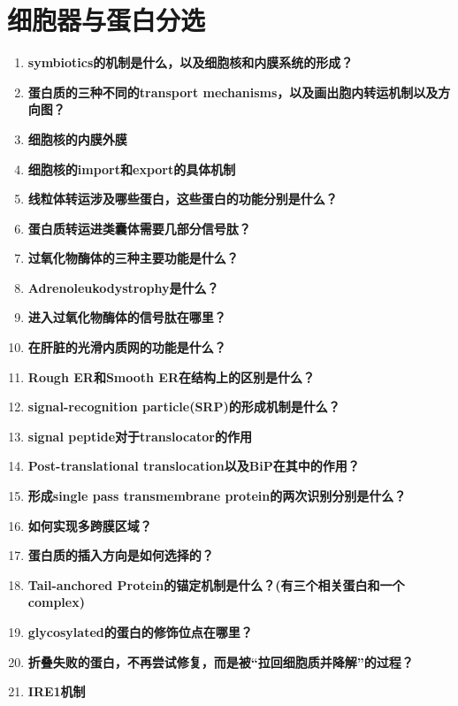 \documentclass[12pt,fontset=none]{ctexart}
\begin{document}
\section*{细胞器与蛋白分选}
\begin{enumerate}
\item \textbf{symbiotics的机制是什么，以及细胞核和内膜系统的形成？}

\item \textbf{蛋白质的三种不同的transport mechanisms，以及画出胞内转运机制以及方向图？}

\item \textbf{细胞核的内膜外膜}

\item \textbf{细胞核的import和export的具体机制}

\item \textbf{线粒体转运涉及哪些蛋白，这些蛋白的功能分别是什么？}

\item \textbf{蛋白质转运进类囊体需要几部分信号肽？}

\item \textbf{过氧化物酶体的三种主要功能是什么？}

\item \textbf{Adrenoleukodystrophy是什么？}

\item \textbf{进入过氧化物酶体的信号肽在哪里？}

\item \textbf{在肝脏的光滑内质网的功能是什么？}

\item \textbf{Rough ER和Smooth ER在结构上的区别是什么？}

\item \textbf{signal-recognition particle(SRP)的形成机制是什么？}

\item \textbf{signal peptide对于translocator的作用}

\item \textbf{Post-translational translocation以及BiP在其中的作用？}

\item \textbf{形成single pass transmembrane protein的两次识别分别是什么？}

\item \textbf{如何实现多跨膜区域？}

\item \textbf{蛋白质的插入方向是如何选择的？}

\item \textbf{Tail-anchored Protein的锚定机制是什么？(有三个相关蛋白和一个complex)}

\item \textbf{glycosylated的蛋白的修饰位点在哪里？}

\item \textbf{折叠失败的蛋白，不再尝试修复，而是被“拉回细胞质并降解”的过程？}

\item \textbf{IRE1机制}

\end{enumerate}
\end{document}
